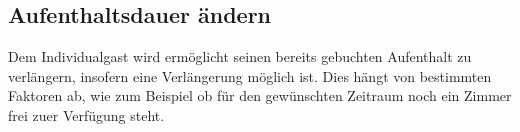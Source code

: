 \documentclass[../SubfileFeatures.tex]{subfiles}
\begin{document}
    \subsection{Aufenthaltsdauer ändern}
    Dem Individualgast wird ermöglicht seinen bereits gebuchten Aufenthalt zu verlängern,
    insofern eine Verlängerung möglich ist. Dies hängt von bestimmten Faktoren ab, wie zum Beispiel
    ob für den gewünschten Zeitraum noch ein Zimmer frei zuer Verfügung steht.
\end{document}
